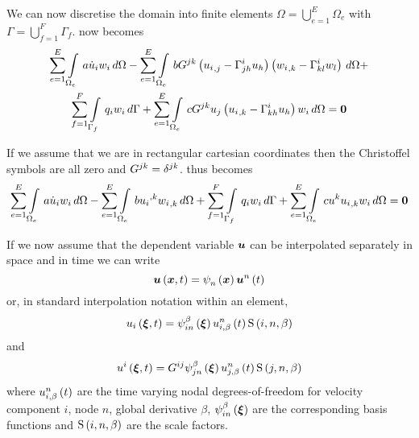 
We can now discretise the domain into finite elements \ie $\Omega=
\displaystyle{\bigcup_{e=1}^{E}}\Omega_{e}$ with
$\Gamma=\displaystyle{\bigcup_{f=1}^{F}}\Gamma_{f}$. 
now becomes
\begin{multline}
  \dsum_{e=1}^{E}\gint{\Omega_{e}}{}{a\dot{u}_{i}w_{i}}{\Omega}-
  \dsum_{e=1}^{E}\gint{\Omega_{e}}{}{bG^{jk}\pbrac{\partialderiv{u_{i}}{j}-
      \christoffel{i}{j}{h}u_{h}} \pbrac{\partialderiv{w_{i}}{k}-
      \christoffel{i}{k}{l}w_{l}}}{\Omega}+ \\
  \dsum_{f=1}^{F}\gint{\Gamma_{f}}{}{q_{i}w_{i}}{\Gamma} +
  \dsum_{e=1}^{E}\gint{\Omega_{e}}{}{cG^{jk}u_{j}\pbrac{\partialderiv{u_{i}}{k}-
      \christoffel{i}{k}{h}u_{h}}w_{i}}{\Omega}=\vectr{0}
  \label{eqn:Burgersfemform1}
\end{multline}

If we assume that we are in rectangular cartesian coordinates then the
Christoffel symbols are all zero and
$G^{jk}=\contrakronecker{j}{k}$.  thus becomes
\begin{equation}
  \dsum_{e=1}^{E}\gint{\Omega_{e}}{}{a\dot{u}_{i}w_{i}}{\Omega}-
  \dsum_{e=1}^{E}\gint{\Omega_{e}}{}{b\contrapartialderiv{u_{i}}{k}
    \partialderiv{w_{i}}{k}}{\Omega}+ 
  \dsum_{f=1}^{F}\gint{\Gamma_{f}}{}{q_{i}w_{i}}{\Gamma} +
  \dsum_{e=1}^{E}\gint{\Omega_{e}}{}{cu^{k}\partialderiv{u_{i}}{k}w_{i}}{\Omega}=\vectr{0}
  \label{eqn:Burgersfemform2}
\end{equation}

If we now assume that the dependent variable $\vectr{u}$ can be interpolated
separately in space and in time we can write
\begin{equation}
  \fnof{\vectr{u}}{\vectr{x},t}=\gbfn{n}{}{\vectr{x}}\fnof{\nodept{\vectr{u}}{n}}{t}
\end{equation}
or, in standard interpolation notation within an element,
\begin{equation}
  \fnof{u_{i}}{\vectr{\xi},t}=\idxgbfn{i}{n}{\beta}{\vectr{\xi}}
  \fnof{\idxnodedof{u}{i}{n}{\beta}}{t}\idxgsf{i}{n}{\beta}
\end{equation}
and
\begin{equation}
  \fnof{u^{i}}{\vectr{\xi},t}=G^{ij}\idxgbfn{j}{n}{\beta}{\vectr{\xi}}
  \fnof{\idxnodedof{u}{j}{n}{\beta}}{t}\idxgsf{j}{n}{\beta}
\end{equation}
where $\fnof{\idxnodedof{u}{i}{n}{\beta}}{t}$ are the time varying nodal
degrees-of-freedom for velocity component $i$, node $n$, global derivative $\beta$,
$\idxgbfn{i}{n}{\beta}{\vectr{\xi}}$ are the corresponding basis functions 
and $\idxgsf{i}{n}{\beta}$ are the scale factors. 

